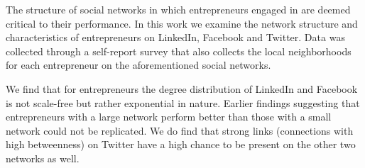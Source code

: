The structure of social networks in which entrepreneurs engaged in are deemed critical to their performance. In this work we examine the network structure and characteristics of entrepreneurs on LinkedIn, Facebook and Twitter. Data was collected through a self-report survey that also collects the local neighborhoods for each entrepreneur on the aforementioned social networks.  

We find that for entrepreneurs the degree distribution of LinkedIn and Facebook is not scale-free but rather exponential in nature. Earlier findings suggesting that entrepreneurs with a large network perform better than those with a small network could not be replicated. We do find that strong links (connections with high betweenness) on Twitter have a high chance to be present on the other two networks as well.